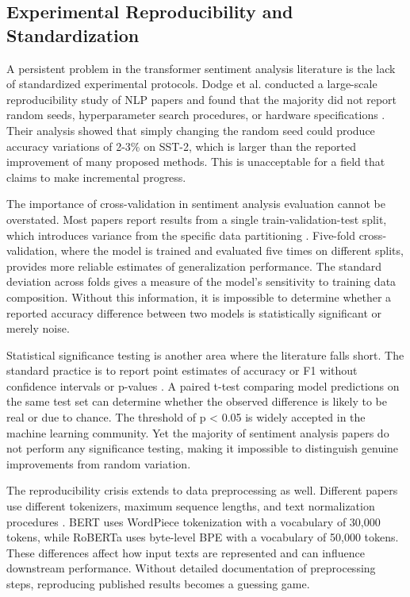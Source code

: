 \documentclass[conference]{IEEEtran}
\begin{document}
\subsection{Experimental Reproducibility and Standardization}

A persistent problem in the transformer sentiment analysis literature is the lack of standardized experimental protocols. Dodge et al. conducted a large-scale reproducibility study of NLP papers and found that the majority did not report random seeds, hyperparameter search procedures, or hardware specifications \cite{r14}. Their analysis showed that simply changing the random seed could produce accuracy variations of 2-3\% on SST-2, which is larger than the reported improvement of many proposed methods. This is unacceptable for a field that claims to make incremental progress.

The importance of cross-validation in sentiment analysis evaluation cannot be overstated. Most papers report results from a single train-validation-test split, which introduces variance from the specific data partitioning \cite{r15}. Five-fold cross-validation, where the model is trained and evaluated five times on different splits, provides more reliable estimates of generalization performance. The standard deviation across folds gives a measure of the model's sensitivity to training data composition. Without this information, it is impossible to determine whether a reported accuracy difference between two models is statistically significant or merely noise.

Statistical significance testing is another area where the literature falls short. The standard practice is to report point estimates of accuracy or F1 without confidence intervals or p-values \cite{r16}. A paired t-test comparing model predictions on the same test set can determine whether the observed difference is likely to be real or due to chance. The threshold of p < 0.05 is widely accepted in the machine learning community. Yet the majority of sentiment analysis papers do not perform any significance testing, making it impossible to distinguish genuine improvements from random variation.

The reproducibility crisis extends to data preprocessing as well. Different papers use different tokenizers, maximum sequence lengths, and text normalization procedures \cite{r17}. BERT uses WordPiece tokenization with a vocabulary of 30,000 tokens, while RoBERTa uses byte-level BPE with a vocabulary of 50,000 tokens. These differences affect how input texts are represented and can influence downstream performance. Without detailed documentation of preprocessing steps, reproducing published results becomes a guessing game.
\end{document}
